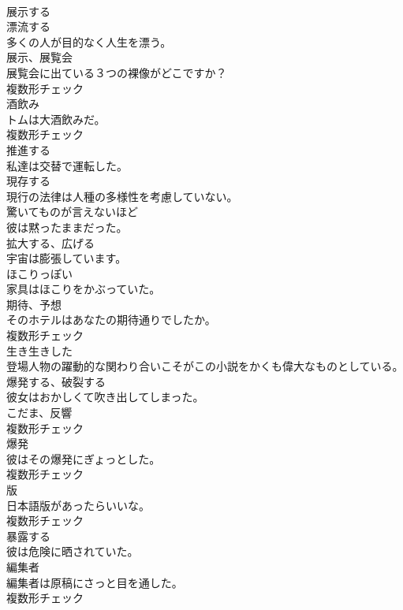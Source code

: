 \documentclass[8pt]{extreport}
\begin{document}
\begin{CJK}{UTF8}{min}
\\	[動詞]	展示する	
\\	[動詞]	漂流する	
\\	多くの人が目的なく人生を漂う。	
\\	[名詞]	展示、展覧会	
\\	展覧会に出ている３つの裸像がどこですか？	
\\	複数形チェック
\\	[名詞]	酒飲み	
\\	トムは大酒飲みだ。	
\\	複数形チェック
\\	[形容詞]	推進する	
\\	私達は交替で運転した。	
\\	[形容詞]	現存する	
\\	現行の法律は人種の多様性を考慮していない。	
\\	[形容詞]	驚いてものが言えないほど	
\\	彼は黙ったままだった。	
\\	[動詞]	拡大する、広げる	
\\	宇宙は膨張しています。	
\\	[形容詞]	ほこりっぽい	
\\	家具はほこりをかぶっていた。	
\\	[名詞]	期待、予想	
\\	そのホテルはあなたの期待通りでしたか。	
\\	複数形チェック
\\	[形容詞]	生き生きした	
\\	登場人物の躍動的な関わり合いこそがこの小説をかくも偉大なものとしている。	
\\	[動詞]	爆発する、破裂する	
\\	彼女はおかしくて吹き出してしまった。	
\\	[名詞]	こだま、反響	
\\	複数形チェック
\\	[名詞]	爆発	
\\	彼はその爆発にぎょっとした。	
\\	複数形チェック
\\	[名詞]	版	
\\	日本語版があったらいいな。	
\\	複数形チェック
\\	[動詞]	暴露する	
\\	彼は危険に晒されていた。	
\\	[名詞]	編集者	
\\	編集者は原稿にさっと目を通した。	
\\	複数形チェック

\end{CJK}
\end{document}
